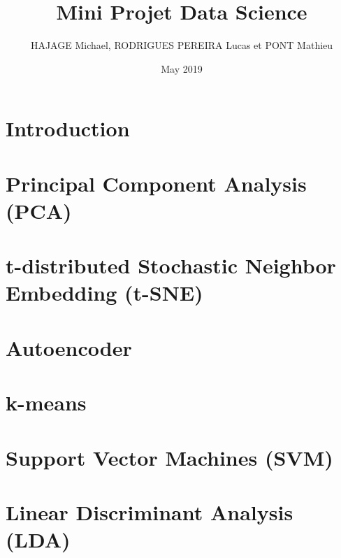 \documentclass{article}
\title{Mini Projet Data Science}
\author{HAJAGE Michael, RODRIGUES PEREIRA Lucas et PONT Mathieu}
\date{May 2019}
\begin{document}
\maketitle

\section{Introduction}

\section{Principal Component Analysis (PCA)}

\section{t-distributed Stochastic Neighbor Embedding (t-SNE)}

\section{Autoencoder}

\section{k-means}

\section{Support Vector Machines (SVM)}

\section{Linear Discriminant Analysis (LDA)}
\end{document}
